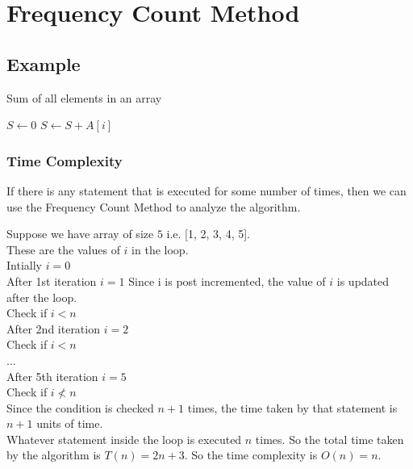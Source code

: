 \documentclass[]{article}
\begin{document}
\section{Frequency Count Method}
\subsection{Example}
\noindent
\begin{algorithm}
\caption{Sum of all elements in an array}\label{sum}
\begin{algorithmic}
\State$S \gets 0$ 
 
    \State$S \gets S + A[i]$
\EndFor\EndProcedure\end{algorithmic}
\end{algorithm}

\subsubsection{Time Complexity}
\noindent
If there is any statement that is executed for some number of times, then we can use the Frequency Count Method to analyze the algorithm.

Suppose we have array of size $5$ i.e. [1, 2, 3, 4, 5]. \\
These are the values of $i$ in the loop. \\
Intially $i = 0$ \\
After 1st iteration $i = 1$  Since i is post incremented, the value of $i$ is updated after the loop. \\
Check if $i < n$ \\
After 2nd iteration $i = 2$ \\
Check if $i < n$ \\
... \\
After 5th iteration $i = 5$ \\
Check if $i \not< n$ \\ 
\noindent
Since the condition is checked $n+1$ times, the time taken by that statement is $n+1$ units of time. \\
Whatever statement inside the loop is executed $n$ times. 
So the total time taken by the algorithm is $T(n) = 2n + 3$. So the time complexity is $O(n) = n$.
\end{document}
